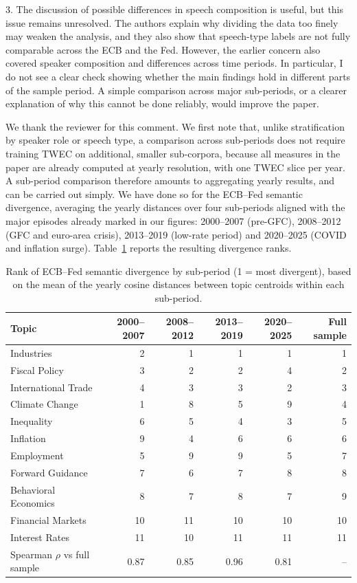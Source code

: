 \documentclass{report}
\theoremstyle{plain}
\begin{document}
3. The discussion of possible differences in speech composition is useful, but this issue remains unresolved. The authors explain why dividing the data too finely may weaken the analysis, and they also show that speech-type labels are not fully comparable across the ECB and the Fed. However, the earlier concern also covered speaker composition and differences across time periods. In particular, I do not see a clear check showing whether the main findings hold in different parts of the sample period. A simple comparison across major sub-periods, or a clearer explanation of why this cannot be done reliably, would improve the paper.
\\
{\color{orange}
We thank the reviewer for this comment. We first note that, unlike stratification by speaker role or speech type, a comparison across sub-periods does not require training TWEC on additional, smaller sub-corpora, because all measures in the paper are already computed at yearly resolution, with one TWEC slice per year. A sub-period comparison therefore amounts to aggregating yearly results, and can be carried out simply. We have done so for the ECB--Fed semantic divergence, averaging the yearly distances over four sub-periods aligned with the major episodes already marked in our figures: 2000--2007 (pre-GFC), 2008--2012 (GFC and euro-area crisis), 2013--2019 (low-rate period) and 2020--2025 (COVID and inflation surge). Table~\ref{tab:subperiods} reports the resulting divergence ranks.

\begin{table}[H]
\centering
\small
\begin{tabular}{lrrrrr}
\toprule
Topic & 2000--2007 & 2008--2012 & 2013--2019 & 2020--2025 & Full sample \\
\midrule
Industries           &  2 &  1 &  1 &  1 &  1 \\
Fiscal Policy        &  3 &  2 &  2 &  4 &  2 \\
International Trade  &  4 &  3 &  3 &  2 &  3 \\
Climate Change       &  1 &  8 &  5 &  9 &  4 \\
Inequality           &  6 &  5 &  4 &  3 &  5 \\
Inflation            &  9 &  4 &  6 &  6 &  6 \\
Employment           &  5 &  9 &  9 &  5 &  7 \\
Forward Guidance     &  7 &  6 &  7 &  8 &  8 \\
Behavioral Economics &  8 &  7 &  8 &  7 &  9 \\
Financial Markets    & 10 & 11 & 10 & 10 & 10 \\
Interest Rates       & 11 & 10 & 11 & 11 & 11 \\
\midrule
Spearman $\rho$ vs full sample & 0.87 & 0.85 & 0.96 & 0.81 & -- \\
\bottomrule
\end{tabular}
\caption{Rank of ECB--Fed semantic divergence by sub-period (1 = most divergent), based on the mean of the yearly cosine distances between topic centroids within each sub-period.}
\label{tab:subperiods}
\end{table}

}
\end{document}
